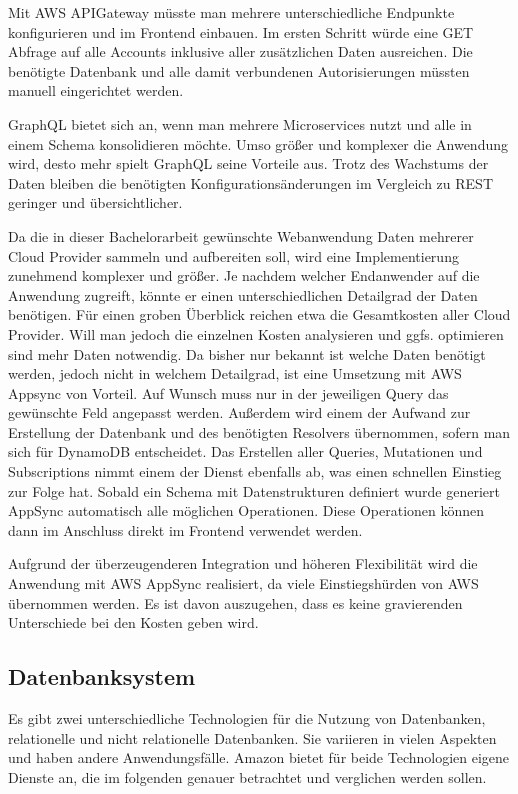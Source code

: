 Mit AWS APIGateway müsste man mehrere unterschiedliche Endpunkte konfigurieren und im Frontend einbauen. Im ersten Schritt würde eine GET Abfrage
auf alle Accounts inklusive aller zusätzlichen Daten ausreichen.
Die benötigte Datenbank und alle damit verbundenen Autorisierungen müssten manuell eingerichtet werden.

GraphQL bietet sich an, wenn man mehrere Microservices nutzt und alle in einem Schema konsolidieren möchte. Umso größer und komplexer die Anwendung wird, desto
mehr spielt GraphQL seine Vorteile aus. Trotz des Wachstums der Daten bleiben die benötigten Konfigurationsänderungen im Vergleich zu REST geringer und übersichtlicher.

Da die in dieser Bachelorarbeit gewünschte Webanwendung Daten mehrerer Cloud Provider sammeln und aufbereiten soll, wird eine Implementierung zunehmend komplexer und größer.
Je nachdem welcher Endanwender auf die Anwendung zugreift, könnte er einen unterschiedlichen Detailgrad der Daten benötigen. Für einen groben Überblick reichen etwa
die Gesamtkosten aller Cloud Provider. Will man jedoch die einzelnen Kosten analysieren und ggfs. optimieren sind mehr Daten notwendig.
Da bisher nur bekannt ist welche Daten benötigt werden, jedoch nicht in welchem Detailgrad, ist eine Umsetzung mit AWS Appsync von Vorteil.
Auf Wunsch muss nur in der jeweiligen Query das gewünschte Feld angepasst werden.
Außerdem wird einem der Aufwand zur Erstellung der Datenbank und des benötigten Resolvers übernommen, sofern man sich für DynamoDB entscheidet.
Das Erstellen aller Queries, Mutationen und Subscriptions nimmt einem der Dienst ebenfalls ab, was einen schnellen Einstieg zur Folge hat.
Sobald ein Schema mit Datenstrukturen definiert wurde generiert AppSync automatisch alle möglichen Operationen. Diese Operationen können dann im Anschluss direkt im Frontend verwendet werden.

Aufgrund der überzeugenderen Integration und höheren Flexibilität wird die Anwendung mit AWS AppSync realisiert, da
viele Einstiegshürden von AWS übernommen werden.
Es ist davon auszugehen, dass es keine gravierenden Unterschiede bei den Kosten geben wird.




\subsection{Datenbanksystem}
Es gibt zwei unterschiedliche Technologien für die Nutzung von Datenbanken, relationelle und nicht relationelle Datenbanken.
Sie variieren in vielen Aspekten und haben andere Anwendungsfälle.
Amazon bietet für beide Technologien eigene Dienste an, die im folgenden genauer betrachtet und verglichen werden sollen.

